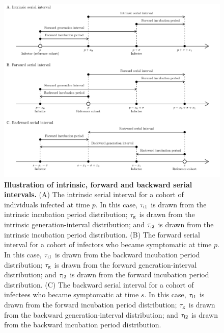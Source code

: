 \documentclass[12pt]{article}
\newcommand{\psymp}{\ensuremath{p}} %
\newcommand{\ssymp}{\ensuremath{s}} %
\newcommand{\gtime}{\tau_{\rm g}} %
\begin{document}
\begin{figure}[!th]
\includegraphics[width=\textwidth]{serial_guide.pdf}
\caption{\textbf{Illustration of intrinsic,
    forward and backward serial intervals.}  (A) The intrinsic serial
  interval for a cohort of individuals infected at time $\psymp$.  In
  this case, $\tau_{\rm i1}$ is drawn from the intrinsic incubation period
  distribution; $\gtime$ is drawn from the intrinsic generation-interval
  distribution; and $\tau_{\rm i2}$ is drawn from the intrinsic incubation period
  distribution.  (B) The forward serial interval for a cohort of
  infectors who became symptomatic at time $\psymp$.  In this case,
  $\tau_{\rm i1}$ is drawn from the backward incubation period distribution; $\gtime$
  is drawn from the forward generation-interval distribution; and $\tau_{\rm i2}$
  is drawn from the forward incubation period distribution.  (C) The
  backward serial interval for a cohort of infectees who became
  symptomatic at time $\ssymp$.  In this case, $\tau_{\rm i1}$ is drawn from the
  forward incubation period distribution; $\gtime$ is drawn from the
  backward generation-interval distribution; and $\tau_{\rm i2}$ is drawn from the
  backward incubation period distribution.}
\label{fig:diagram}
\end{figure}
\end{document}
